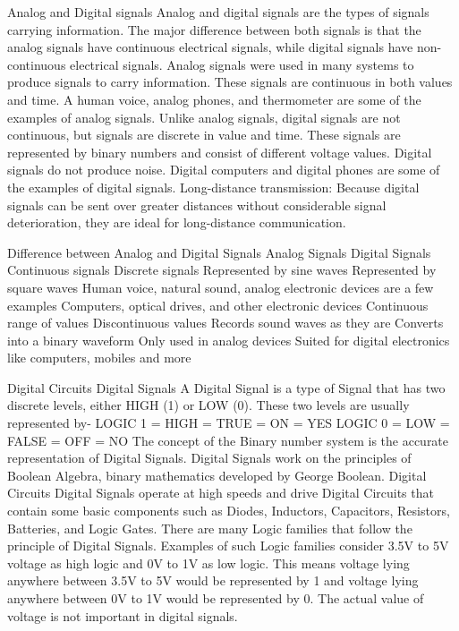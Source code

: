 \documentclass{article}
\begin{document}
Analog and Digital signals
Analog and digital signals are the types of signals carrying information. The major
difference between both signals is that the analog signals have continuous
electrical signals, while digital signals have non-continuous electrical signals.
Analog signals were used in
many systems to produce
signals
to
carry
information. These signals
are
continuous
in
both
values and time. A human
voice, analog phones, and
thermometer are some of
the
examples
of
analog
signals.
Unlike analog signals, digital signals are not continuous, but signals are discrete in
value and time. These signals are represented by binary numbers and consist of
different voltage values. Digital signals do not produce noise. Digital computers
and digital phones are some of the examples of digital signals. Long-distance
transmission: Because digital signals can be sent over greater distances without
considerable signal deterioration, they are ideal for long-distance communication.


Difference between Analog and Digital Signals
Analog Signals
Digital Signals
Continuous signals
Discrete signals
Represented by sine waves
Represented by square waves
Human voice, natural sound, 
analog electronic devices are a 
few examples
Computers, optical drives, and 
other electronic devices
Continuous range of values
Discontinuous values
Records sound waves as they 
are
Converts into a binary 
waveform
Only used in analog devices
Suited for digital electronics 
like computers, mobiles and 
more


Digital Circuits
Digital Signals
A Digital Signal is a type of Signal that has two discrete levels, either HIGH (1) or
LOW (0). These two levels are usually represented by-
LOGIC 1 = HIGH = TRUE = ON = YES
LOGIC 0 = LOW = FALSE = OFF = NO
The concept of the Binary number system is the accurate representation of
Digital Signals. Digital Signals work on the principles of Boolean Algebra, binary
mathematics developed by George Boolean.
Digital Circuits
Digital Signals operate at high speeds and drive Digital Circuits that contain some
basic components such as Diodes, Inductors, Capacitors, Resistors, Batteries,
and Logic Gates.
There are many Logic families that follow the principle of Digital Signals.
Examples of such Logic families consider 3.5V to 5V voltage as high logic and 0V
to 1V as low logic. This means voltage lying anywhere between 3.5V to 5V would
be represented by 1 and voltage lying anywhere between 0V to 1V would be
represented by 0. The actual value of voltage is not important in digital signals.
\end{document}

